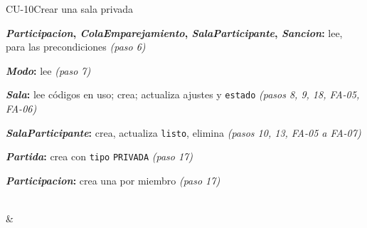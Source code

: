 \begin{fichacu}{CU-10}{Crear una sala privada}
{\begin{cudatos}
      \item \textbf{\textit{Participacion}, \textit{ColaEmparejamiento}, \textit{SalaParticipante}, \textit{Sancion}:} lee, para las precondiciones \textit{(paso 6)}
      \item \textbf{\textit{Modo}:} lee \textit{(paso 7)}
      \item \textbf{\textit{Sala}:} lee códigos en uso; crea; actualiza ajustes y \texttt{estado} \textit{(pasos 8, 9, 18, \mbox{FA-05}, \mbox{FA-06})}
      \item \textbf{\textit{SalaParticipante}:} crea, actualiza \texttt{listo}, elimina \textit{(pasos 10, 13, \mbox{FA-05} a \mbox{FA-07})}
      \item \textbf{\textit{Partida}:} crea con \texttt{tipo} \texttt{PRIVADA} \textit{(paso 17)}
      \item \textbf{\textit{Participacion}:} crea una por miembro \textit{(paso 17)}
    \end{cudatos}} \\
   &  \\ \hline
\end{fichacu}
\clearpage

